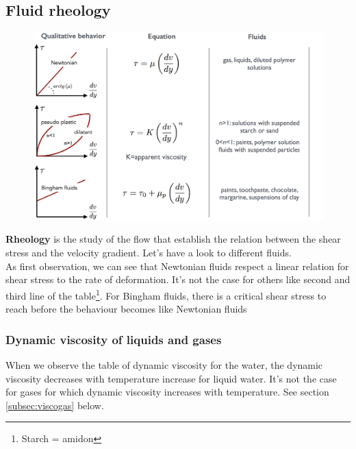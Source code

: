 \subsection{Fluid rheology}
\begin{figure}
	\vspace{-5mm}
	\includegraphics[scale=0.25]{ch1/7}
\end{figure}
\textbf{Rheology} is the study of the flow that establish the relation between the shear stress and the velocity gradient. Let's have a look to different fluids. \\
As first observation, we can see that Newtonian fluids respect a linear relation for shear stress to the rate of deformation. It's not the case for others like second and third line of the table\footnote{Starch = amidon}. For Bingham fluids, there is a critical shear stress to reach before the behaviour becomes like Newtonian fluids 
	
\subsubsection{Dynamic viscosity of liquids and gases}	
When we observe the table of dynamic viscosity for the water, the dynamic viscosity decreases with temperature increase for liquid water. It's not the case for gases for which dynamic viscosity increases with temperature. See section \ref{subsec:viscogas} below.
	
